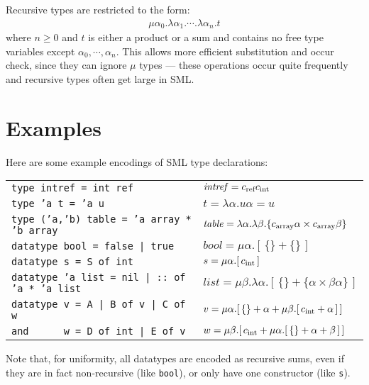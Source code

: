\documentclass[twoside]{article}
\newcommand{\x}[1]{\mathit{#1}}
\newcommand{\f}[1]{\mbox{#1}}
\renewcommand{\c}[1]{c_{\f{\scriptsize #1}}}
\begin{document}
Recursive types are restricted to the form:
\begin{eqnarray*}
\mu\alpha_0 . \lambda\alpha_1 . \cdots . \lambda\alpha_n . t 
\end{eqnarray*}
where $n\geq0$ and $t$ is either a product or a sum and contains no free type variables except $\alpha_0,\cdots,\alpha_n$. This allows more efficient substitution and occur check, since they can ignore $\mu$ types --- these operations occur quite frequently and recursive types often get large in SML.


\section{Examples}
\label{coreexamples}

Here are some example encodings of SML \cite{definition} type declarations:

\begin{tabular}{ll}
{\small\tt type intref = int ref} &
$\x{intref} = \c{ref} \c{int}$
\\
{\small\tt type 'a t = 'a u} &
$t = \lambda\alpha . u \alpha = u$
\\
{\small\tt type ('a,'b) table = 'a array * 'b array} &
$\x{table} = \lambda\alpha . \lambda\beta . \{\c{array}\alpha \times \c{array}\beta\}$
\\
{\small\tt datatype bool = false | true} &
$\x{bool} = \mu\alpha . [\,\{\} + \{\}\,]$
\\
{\small\tt datatype s = S of int} &
$s = \mu\alpha . [\,\c{int}\,]$
\\
{\small\tt datatype 'a list = nil |\ :: of 'a * 'a list} &
$\x{list} = \mu\beta . \lambda\alpha . [\,\{\} + \{\alpha \times \beta \alpha\}\,]$
\\
{\small\tt datatype v = A | B of v | C of w} &
$v = \mu\alpha . [\,\{\} + \alpha + \mu\beta . [\,\c{int} + \alpha\,]\,]$ \\
{\small\tt and\ \ \ \ \ \ w = D of int | E of v} &
$w = \mu\beta . [\,\c{int} + \mu\alpha . [\,\{\} + \alpha + \beta\,]\,]$
\end{tabular}

Note that, for uniformity, all datatypes are encoded as recursive sums, even if they are in fact non-recursive (like {\tt bool}), or only have one constructor (like {\tt s}).


\end{document}
